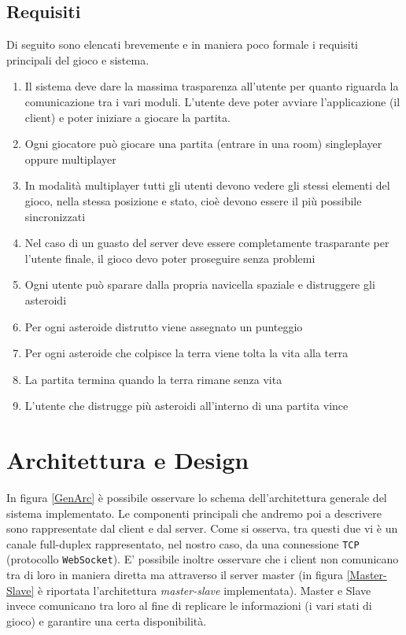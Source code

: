 \documentclass[paper=a4, fontsize=11pt]{scrartcl} %
\numberwithin{equation}{section} %
\numberwithin{figure}{section} %
\numberwithin{table}{section} %
\begin{document}
\subsection{Requisiti}
Di seguito sono elencati brevemente e in maniera poco formale i requisiti principali del gioco e sistema.
\begin{enumerate}
\item Il sistema deve dare la massima trasparenza all'utente per quanto riguarda la comunicazione tra i vari moduli. L'utente deve poter avviare l'applicazione (il client) e poter iniziare a giocare la partita.
\item Ogni giocatore può giocare una partita (entrare in una room) singleplayer oppure multiplayer
\item In modalità multiplayer tutti gli utenti devono vedere gli stessi elementi del gioco, nella stessa posizione e stato, cioè devono essere il più possibile sincronizzati
\item Nel caso di un guasto del server deve essere completamente trasparante per l'utente finale, il gioco devo poter proseguire senza problemi
\item Ogni utente può sparare dalla propria navicella spaziale e distruggere gli asteroidi
\item Per ogni asteroide distrutto viene assegnato un punteggio
\item Per ogni asteroide che colpisce la terra viene tolta la vita alla terra
\item La partita termina quando la terra rimane senza vita
\item L'utente che distrugge più asteroidi all'interno di una partita vince
\end{enumerate}

\section{Architettura e Design}

In figura \ref{GenArc} è possibile osservare lo schema dell'architettura generale del sistema implementato. Le componenti principali che andremo poi a descrivere sono rappresentate dal client e dal server. Come si osserva, tra questi due vi è un canale full-duplex rappresentato, nel nostro caso, da una connessione \texttt{TCP} (protocollo \texttt{WebSocket}). E' possibile inoltre osservare che i client non comunicano tra di loro in maniera diretta ma attraverso il server master (in figura \ref{Master-Slave} è riportata l'architettura \textit{master-slave} implementata). Master e Slave invece comunicano tra loro al fine di replicare le informazioni (i vari stati di gioco) e garantire una certa disponibilità.
\end{document}
